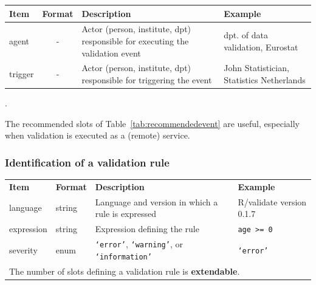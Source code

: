 \documentclass[a4paper, 11pt,titlepage]{article}
\newcommand{\code}[1]{\texttt{#1}}
\begin{document}
\begin{center}
\begin{tabular}{|lp{15mm}p{}p{}|}
\hline
\textbf{Item} & \textbf{Format} & \textbf{Description} &\textbf{Example}\\
\hline
agent   & \multicolumn{1}{c}{-} & Actor (person, institute, dpt) responsible for executing the validation event & dpt. of data validation, Eurostat\\
trigger & \multicolumn{1}{c}{-} & Actor (person, institute, dpt) responsible for triggering the event  & John Statistician, Statistics Netherlands\\
\hline
\end{tabular}
\label{tab:recommendedevent}.
\end{center}
The recommended slots of Table~\ref{tab:recommendedevent} are useful, especially when validation is executed as a (remote) service.


\subsubsection{Identification of a validation rule}
\label{sect:idrule}
%
\begin{center}
\begin{tabular}{|lp{15mm}p{}p{}|}
\hline
\textbf{Item} & \textbf{Format} & \textbf{Description} &\textbf{Example}\\
language      & string   & Language and version in which a rule is expressed & R/validate version 0.1.7\\
expression    & string   & Expression defining the rule           & \code{age >= 0}\\
severity      & enum     & \code{`error'}, \code{`warning'},
                           or \code{`information'}                & \code{`error'}\\ 

\hline
\multicolumn{4}{|l|}{The number of slots defining a validation rule is \textbf{extendable}.
}\\
\hline
\end{tabular}
\end{center}


\end{document}
